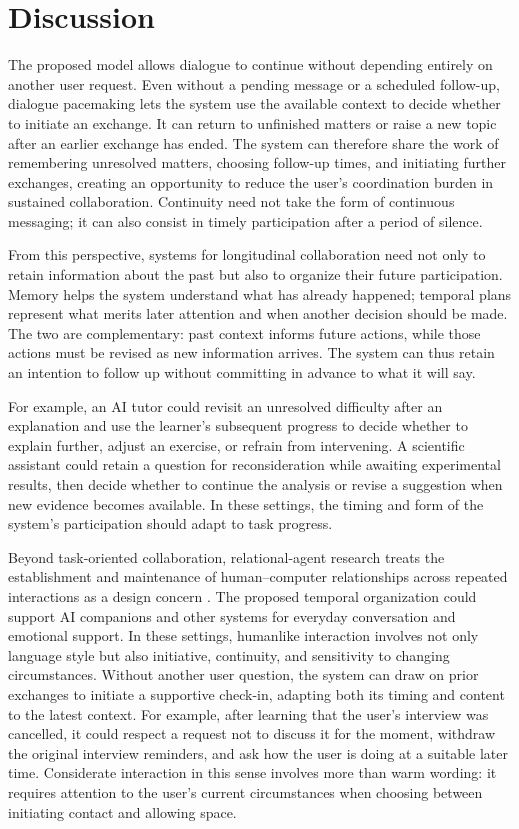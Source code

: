 \documentclass[manuscript,nonacm]{acmart}
\begin{document}
\section{Discussion}

The proposed model allows dialogue to continue without depending entirely on
another user request. Even without a pending message or a scheduled follow-up,
dialogue pacemaking lets the system use the available context to decide whether
to initiate an exchange. It can return to unfinished matters or raise a new
topic after an earlier exchange has ended. The system can therefore share the
work of remembering unresolved matters, choosing follow-up times, and initiating
further exchanges, creating an opportunity to reduce the user's coordination
burden in sustained collaboration. Continuity need not take the form of
continuous messaging; it can also consist in timely participation after a period
of silence.

From this perspective, systems for longitudinal collaboration need not only to
retain information about the past but also to organize their future participation.
Memory helps the system understand what has already happened; temporal plans
represent what merits later attention and when another decision should be made.
The two are complementary: past context informs future actions, while those
actions must be revised as new information arrives. The system can thus retain
an intention to follow up without committing in advance to what it will say.

For example, an AI tutor could revisit an unresolved difficulty after an
explanation and use the learner's subsequent progress to decide whether to
explain further, adjust an exercise, or refrain from intervening. A scientific
assistant could retain a question for reconsideration while awaiting experimental
results, then decide whether to continue the analysis or revise a suggestion when
new evidence becomes available. In these settings, the timing and form of the
system's participation should adapt to task progress.

Beyond task-oriented collaboration, relational-agent research treats the
establishment and maintenance of human--computer relationships across repeated
interactions as a design concern \cite{bickmore2005relationships}. The proposed
temporal organization could support AI companions and other systems for everyday
conversation and emotional support. In these settings, humanlike
interaction involves not only language style but also initiative, continuity,
and sensitivity to changing circumstances. Without another user question, the
system can draw on prior exchanges to initiate a supportive check-in, adapting
both its timing and content to the latest context. For example, after learning
that the user's interview was cancelled, it could respect a request not to
discuss it for the moment, withdraw the original interview reminders, and ask
how the user is doing at a suitable later time. Considerate interaction in this
sense involves more than warm wording: it requires attention to the user's
current circumstances when choosing between initiating contact and allowing
space.
\end{document}
